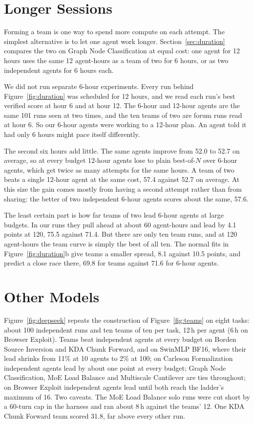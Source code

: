 \documentclass[numbers,10pt]{arxiv}
\renewcommand{\paragraph}[1]{\sansbf{#1}}
\begin{document}
\section{Longer Sessions}
\label{app:duration}
Forming a team is one way to spend more compute on each attempt. The simplest alternative is to let one agent work longer. Section~\ref{sec:duration} compares the two on Graph Node Classification at equal cost: one agent for 12 hours uses the same 12 agent-hours as a team of two for 6 hours, or as two independent agents for 6 hours each.

We did not run separate 6-hour experiments. Every run behind Figure~\ref{fig:duration} was scheduled for 12 hours, and we read each run's best verified score at hour 6 and at hour 12. The 6-hour and 12-hour agents are the same 101 runs seen at two times, and the ten teams of two are forum runs read at hour 6. So our 6-hour agents were working to a 12-hour plan. An agent told it had only 6 hours might pace itself differently.

The second six hours add little. The same agents improve from 52.0 to 52.7 on average, so at every budget 12-hour agents lose to plain best-of-$N$ over 6-hour agents, which get twice as many attempts for the same hours. A team of two beats a single 12-hour agent at the same cost, 57.4 against 52.7 on average. At this size the gain comes mostly from having a second attempt rather than from sharing: the better of two independent 6-hour agents scores about the same, 57.6.

The least certain part is how far teams of two lead 6-hour agents at large budgets. In our runs they pull ahead at about 60 agent-hours and lead by 4.1 points at 120, 75.5 against 71.4. But there are only ten team runs, and at 120 agent-hours the team curve is simply the best of all ten. The normal fits in Figure~\ref{fig:duration}b give teams a smaller spread, 8.1 against 10.5 points, and predict a close race there, 69.8 for teams against 71.6 for 6-hour agents.

\section{Other Models}
\label{app:models}
\paragraph{DeepSeek V4.1 Flash.} Figure~\ref{fig:deepseek} repeats the construction of Figure~\ref{fig:teams} on eight tasks: about 100 independent runs and ten teams of ten per task, 12\,h per agent (6\,h on Browser Exploit). Teams beat independent agents at every budget on Borden Source Inversion and KDA Chunk Forward, and on SwinMLP BF16, where their lead shrinks from 11\% at 10 agents to 2\% at 100; on Carleson Formalization independent agents lead by about one point at every budget; Graph Node Classification, MoE Load Balance and Multiscale Cantilever are ties throughout; on Browser Exploit independent agents lead until both reach the ladder's maximum of 16. Two caveats. The MoE Load Balance solo runs were cut short by a 60-turn cap in the harness and ran about 8\,h against the teams' 12. One KDA Chunk Forward team scored 31.8, far above every other run.
\end{document}

